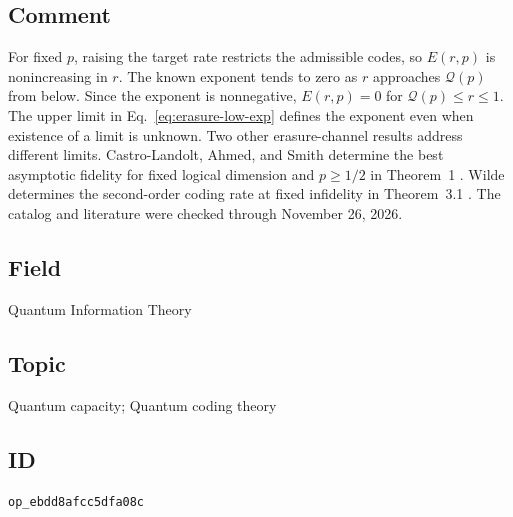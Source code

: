 \subsection*{Comment}

For fixed $p$, raising the target rate restricts the admissible codes, so $E(r,p)$ is nonincreasing in $r$. The known exponent tends to zero as $r$ approaches $\mathcal{Q}(p)$ from below. Since the exponent is nonnegative, $E(r,p)=0$ for $\mathcal{Q}(p)\leq r\leq 1$. The upper limit in Eq.~\eqref{eq:erasure-low-exp} defines the exponent even when existence of a limit is unknown. Two other erasure-channel results address different limits. Castro-Landolt, Ahmed, and Smith determine the best asymptotic fidelity for fixed logical dimension and $p\geq 1/2$ in Theorem~1 . Wilde determines the second-order coding rate at fixed infidelity in Theorem~3.1 . The catalog and literature were checked through November 26, 2026.

\subsection*{Field}

Quantum Information Theory

\subsection*{Topic}

Quantum capacity; Quantum coding theory

\subsection*{ID}

\texttt{op\_ebdd8afcc5dfa08c}
